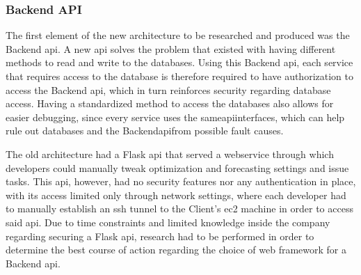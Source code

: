 


\subsubsection{Backend API}\label{methodology:ss:backendapi}
The first element of the new architecture to be researched and produced was the Backend \gls{api}. A new \gls{api} solves the problem that existed with having different methods to read and write to the databases. Using this Backend \gls{api}, each service that requires access to the database is therefore required to have authorization to access the Backend \gls{api}, which in turn reinforces security regarding database access. Having a standardized method to access the databases also allows for easier debugging, since every service uses the same\gls{api}interfaces, which can help rule out databases and the Backend\gls{api}from possible fault causes.

The old architecture had a Flask \gls{api} that served a webservice through which developers could manually tweak optimization and forecasting settings and issue tasks. This \gls{api}, however, had no security features nor any authentication in place, with its access limited only through network settings, where each developer had to manually establish an \gls{ssh} tunnel to the Client's \gls{ec2} machine in order to access said \gls{api}. Due to time constraints and limited knowledge inside the company regarding securing a Flask \gls{api}, research had to be performed in order to determine the best course of action regarding the choice of web framework for a Backend \gls{api}.


